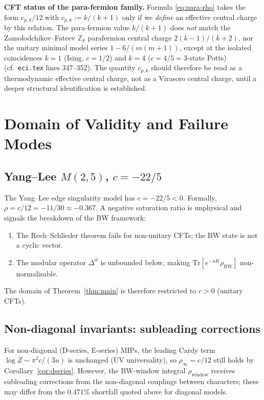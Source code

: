 \documentclass[12pt]{article}
\begin{document}
\medskip
\noindent\textbf{CFT status of the para-fermion family.}
Formula \eqref{eq:para-rho} takes the form $c_{p,k}/12$ with
$c_{p,k} := k/(k+1)$ only if we \emph{define} an effective central
charge by this relation.  The para-fermion value $k/(k+1)$ does
\emph{not} match the Zamolodchikov--Fateev $\mathbb{Z}_k$
parafermion central charge $2(k-1)/(k+2)$, nor the unitary minimal
model series $1 - 6/(m(m+1))$, except at the isolated coincidences
$k=1$ (Ising, $c=1/2$) and $k=4$ ($c=4/5 = 3$-state Potts)
(cf.\ \texttt{eci.tex} lines 347--352).  The quantity $c_{p,k}$
should therefore be read as a thermodynamic effective central
charge, not as a Virasoro central charge, until a deeper structural
identification is established.

\section{Domain of Validity and Failure Modes}

\subsection{Yang--Lee $M(2,5)$, $c = -22/5$}

The Yang--Lee edge singularity model has $c = -22/5 < 0$.  Formally,
$\rho = c/12 = -11/30 \approx -0.367$.  A negative saturation ratio
is unphysical and signals the breakdown of the BW framework:
\begin{enumerate}
\item The Reeh--Schlieder theorem fails for non-unitary CFTs; the BW
      state is not a cyclic vector.
\item The modular operator $\Delta^{it}$ is unbounded below, making
      $\mathrm{Tr}[e^{-uK}\rho_{\mathrm{BW}}]$ non-normalisable.
\end{enumerate}
The domain of Theorem~\ref{thm:main} is therefore restricted to
$c > 0$ (unitary CFTs).

\subsection{Non-diagonal invariants: subleading corrections}

For non-diagonal (D-series, E-series) MIPs, the leading Cardy term
$\log Z \sim \pi^2 c/(3u)$ is unchanged (UV universality), so
$\rho_\infty = c/12$ still holds by Corollary~\ref{cor:dseries}.
However, the BW-window integral $\rho_{\mathrm{window}}$ receives
subleading corrections from the non-diagonal couplings between
characters; these may differ from the $0.471\%$ shortfall quoted
above for diagonal models.
\end{document}
